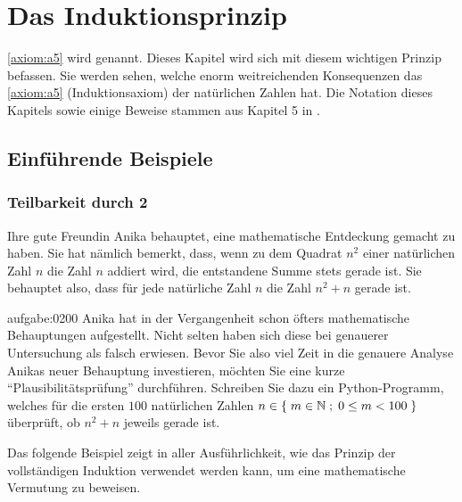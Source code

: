 \chapter{Das Induktionsprinzip}\label{ch:Kapitel02}

\cref{axiom:a5} wird  genannt. Dieses Kapitel wird sich mit diesem wichtigen Prinzip befassen.
Sie werden sehen, welche enorm weitreichenden Konsequenzen das \cref{axiom:a5} (Induktionsaxiom) der natürlichen Zahlen hat. Die Notation dieses Kapitels sowie einige Beweise stammen aus Kapitel 5 in \cite{AmannEscher1}.

\section{Einführende Beispiele}

\subsection{Teilbarkeit durch 2}
Ihre gute Freundin Anika behauptet, eine mathematische Entdeckung gemacht zu haben. Sie hat nämlich bemerkt, dass, wenn zu dem Quadrat $n^2$ einer natürlichen Zahl $n$ die Zahl $n$ addiert wird, die entstandene Summe stets gerade ist. Sie behauptet also, dass für jede natürliche Zahl $n$ die Zahl $n^2+n$ gerade ist.

\begin{aufgabe}{aufgabe:0200}
Anika hat in der Vergangenheit schon öfters mathematische Behauptungen aufgestellt. Nicht selten haben sich diese bei genauerer Untersuchung als falsch erwiesen. Bevor Sie also viel Zeit in die genauere Analyse Anikas neuer Behauptung investieren, möchten Sie eine kurze \enquote{Plausibilitätsprüfung} durchführen. Schreiben Sie dazu ein Python-Programm, welches für die ersten $100$ natürlichen Zahlen $n\in\left\{\;m\in\mathbb{N} \; ; \; 0\leq m < 100 \;\right\}$ überprüft, ob $n^2+n$ jeweils gerade ist.
\end{aufgabe}
\noindent
Das folgende Beispiel zeigt in aller Ausführlichkeit, wie das Prinzip der vollständigen Induktion verwendet werden kann, um eine mathematische Vermutung zu beweisen.


